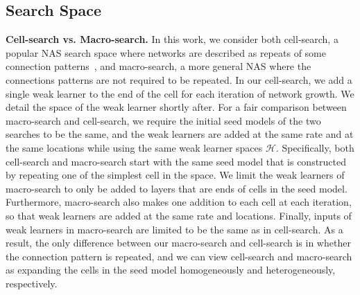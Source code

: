 \subsection{Search Space}
\label{sec:search_space}

\textbf{Cell-search vs. Macro-search.}
In this work, we consider both cell-search, 
a popular NAS search space where networks are described as repeats of some connection patterns~\citep{NASCell,Real2018RegularizedEF,Pham2018EfficientNA,Liu2018DARTSDA}, 
and macro-search, a more general NAS where the connections patterns are not required to be repeated. 
In our cell-search, we add a single weak learner to the end of the cell for each iteration of network growth. 
We detail the space of the weak learner shortly after.
For a fair comparison between macro-search and cell-search, we require the initial seed models of the two searches to be the same, and the 
weak learners are added at the same rate and at the same locations while using the same weak learner spaces $\mathcal{H}$.   
Specifically, both cell-search and macro-search start with the same seed model that is constructed by repeating one of the simplest cell 
in the space. We limit the weak learners of macro-search to only be added to layers that are ends of cells in the seed model.  
Furthermore, macro-search also makes one addition to each cell at each iteration, so that weak learners are added at the same rate and locations. 
Finally, inputs of weak learners in macro-search are limited to be the same as in cell-search. 
As a result, the only difference between our macro-search and cell-search is in whether the connection pattern is repeated, and we can 
view cell-search and macro-search as expanding the cells in the seed model homogeneously and heterogeneously, respectively. 



